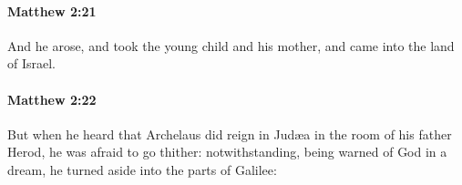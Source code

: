 		\paragraph{Matthew 2:21} %
			\label{MATTHEW-2-21}

			And he arose, and took the young child and his mother, and came into the land of Israel.

			\begin{framed}
			\scriptsize
				\begin{compactdesc}
					\item[SBLG] 
				\end{compactdesc}
			\end{framed}

		\paragraph{Matthew 2:22} %
			\label{MATTHEW-2-22}

			But when he heard that Archelaus did reign in Judæa in the room of his father Herod, he was afraid to go thither: notwithstanding, being warned of God in a dream, he turned aside into the parts of Galilee:

